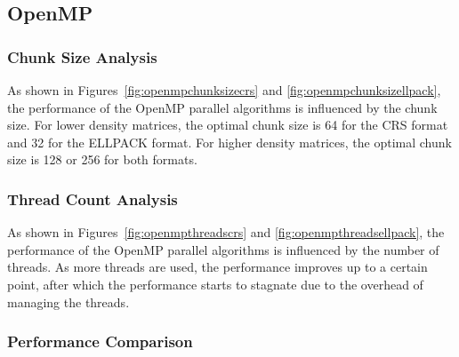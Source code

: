 \documentclass[12pt,oneside]{book} %
\begin{document}
\newpage
\subsection{OpenMP}
\subsubsection{Chunk Size Analysis}

As shown in Figures~\ref{fig:openmpchunksizecrs} and
\ref{fig:openmpchunksizellpack}, the performance of the OpenMP parallel
algorithms is influenced by the chunk size. For lower density matrices, the
optimal chunk size is 64 for the CRS format and 32 for the ELLPACK format. For
higher density matrices, the optimal chunk size is 128 or 256 for both formats.

\subsubsection{Thread Count Analysis}

As shown in Figures~\ref{fig:openmpthreadscrs} and
\ref{fig:openmpthreadsellpack}, the performance of the OpenMP parallel
algorithms is influenced by the number of threads. As more threads are used,
the performance improves up to a certain point, after which the performance
starts to stagnate due to the overhead of managing the threads.

\subsubsection{Performance Comparison}
\end{document}
